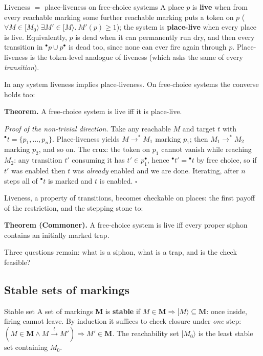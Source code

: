 \begin{notebox}{Liveness $=$ place-liveness on free-choice systems}
A place $p$ is \textbf{live} when from every reachable marking some further reachable marking puts a token on $p$ ($\forall M \in [M_0\rangle\ \exists M' \in [M\rangle.\ M'(p) \geq 1$); the system is \textbf{place-live} when every place is live. Equivalently, $p$ is dead when it can permanently run dry, and then every transition in ${}^\bullet p \cup p^\bullet$ is dead too, since none can ever fire again through $p$. Place-liveness is the token-level analogue of liveness (which asks the same of every \emph{transition}).
\par\smallskip
In any system liveness implies place-liveness. On free-choice systems the converse holds too:
\par\smallskip
\textbf{Theorem.} A free-choice system is live iff it is place-live.
\par\smallskip
\textit{Proof of the non-trivial direction.} Take any reachable $M$ and target $t$ with ${}^\bullet t = \{p_1, \ldots, p_n\}$. Place-liveness yields $M \to^\ast M_1$ marking $p_1$; then $M_1 \to^\ast M_2$ marking $p_2$, and so on. The crux: the token on $p_1$ cannot vanish while reaching $M_2$: any transition $t'$ consuming it has $t' \in p_1^\bullet$, hence ${}^\bullet t' = {}^\bullet t$ by free choice, so if $t'$ was enabled then $t$ was \emph{already} enabled and we are done. Iterating, after $n$ steps all of ${}^\bullet t$ is marked and $t$ is enabled. \hfill$\square$
\par\smallskip
Liveness, a property of transitions, becomes checkable on places: the first payoff of the restriction, and the stepping stone to:
\par\smallskip
\textbf{Theorem (Commoner).} A free-choice system is live iff every proper siphon contains an initially marked trap.
\par\smallskip
Three questions remain: what is a siphon, what is a trap, and is the check feasible?
\end{notebox}

\subsection{Stable sets of markings}

\begin{definitionbox}{Stable set}
A set of markings $\mathbf{M}$ is \textbf{stable} if $M \in \mathbf{M} \Rightarrow [M\rangle \subseteq \mathbf{M}$: once inside, firing cannot leave. By induction it suffices to check closure under \emph{one} step: $(M \in \mathbf{M} \wedge M \xrightarrow{t} M') \Rightarrow M' \in \mathbf{M}$. The reachability set $[M_0\rangle$ is the least stable set containing $M_0$.
\end{definitionbox}

